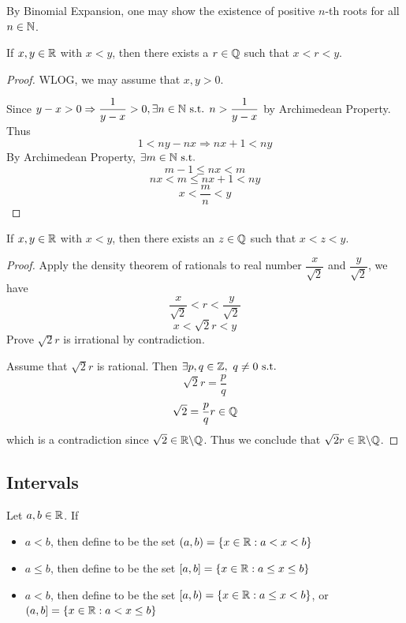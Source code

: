 \documentclass[a4paper,12pt]{article}
\begin{document}
\begin{remark}
    By Binomial Expansion, one may show the existence of positive \(n\)-th roots for all \(n\in\mathbb{N}\).\\
\end{remark}

\begin{theorem}
    If \(x,y\in\mathbb{R}\) with \(x<y\), then there exists a   \(r\in\mathbb{Q}\) such that \(x<r<y\).
    \begin{proof}
        WLOG, we may assume that \(x,y>0\).

        Since \(y-x>0\Rightarrow\dfrac{1}{y-x}>0,\exists n\in\mathbb{N}\text{ s.t. } n>\dfrac{1}{y-x}\) by Archimedean Property. Thus 
        \[1<ny-nx\Rightarrow nx+1<ny\]
        By Archimedean Property, \(\exists m\in\mathbb{N}\text{ s.t. }\)
        \[m-1\le nx<m\]
        \[nx<m\le nx+1<ny\]
        \[x<\frac{m }{n }<y\]
    \end{proof}
\end{theorem}

\newpage

\begin{corollary}
    If \(x,y\in\mathbb{R}\) with \(x<y\), then there exists an  \(z\in\mathbb{Q}\) such that \(x<z<y\).
    \begin{proof}
        Apply the density theorem of rationals to real number \(\dfrac{x }{\sqrt{2}}\) and \(\dfrac{y }{\sqrt{2}}\), we have 
        \[\frac{x }{\sqrt{2}}<r<\frac{y }{\sqrt{2}}\]
        \[x<\sqrt{2}r<y\]
         Prove \(\sqrt{2}r\) is irrational by contradiction.
        
        Assume that \(\sqrt{2}r\) is rational. Then \(\exists p,q\in\Z,\ q\neq0\st\)
        \[\sqrt{2}r=\frac{p }{q}\]
        \[\sqrt{2}=\frac{p}{q}r\in\mathbb{Q}\]
        which is a contradiction since \(\sqrt{2}\in\mathbb{R}\backslash\mathbb{Q}\). Thus we conclude that \(\sqrt{2}r\in\mathbb{R}\backslash\mathbb{Q}\).
    \end{proof}
\end{corollary}

\newpage

\subsection{Intervals}

\begin{definition}
    Let \(a,b\in\mathbb{R}\). If \begin{itemize}
        \item \(a<b\), then define  to be the set \((a,b)=\{x\in\mathbb{R}:a<x<b\}\)
        \item \(a\le b\), then define  to be the set \([a,b]=\{x\in\mathbb{R}:a\le x\le b\}\)
        \item \(a<b\), then define  to be the set \([a,b)=\{x\in\mathbb{R}:a\le x<b\}\), or 
        \((a,b]=\{x\in\mathbb{R}:a<x\le b\}\)\\
    \end{itemize}
\end{definition}
\end{document}
